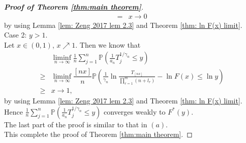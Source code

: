 \documentclass[12pt]{article}
\theoremstyle{plain}
\theoremstyle{definition}
\theoremstyle{remark}
\begin{document}
\begin{proof}[\textit{\textbf{Proof of Theorem \ref{thm:main theorem}}}]
\begin{equation*}
\begin{aligned}
=&x\to 0
 \end{aligned}
\end{equation*}
by using Lemma \ref{lem: Zeng 2017   lem 2.3} and Theorem \ref{thm: ln F(x) limit}.\\
Case 2: $y>1$.\\
Let $x\in (0,1)$, $x\nearrow 1$. Then we know that
\begin{equation*}
    \begin{aligned}
        & \liminf _{n \rightarrow \infty} \frac{1}{n} \sum_{j=1}^{n} \mathbb{P}\left(\frac{1}{a_{n}} T_{j}^{1 / \gamma_{n}} \leqslant y\right) \\
    \geq& \liminf _{n \rightarrow \infty}\dfrac{[nx]}{n} \mathbb{P}\left(\frac{1}{\gamma_{n}} \ln \frac{T_{[n x]}}{\prod_{r=1}^{m}\left(n+l_{r}\right)}-\ln F(x) \leqslant \ln y\right)
    \\  \geqslant
        &x\to 1,
    \end{aligned}
\end{equation*}
by using Lemma \ref{lem: Zeng 2017   lem 2.3} and Theorem \ref{thm: ln F(x) limit}.\\
Hence $\frac{1}{n} \sum_{j=1}^{n} \mathbb{P}\left(\frac{1}{a_{n}} T_{j}^{1 / \gamma_{n}} \leq y\right)$ converges weakly to $F^*(y)$.\\
The last part of the proof is similar to that in $(a)$. \\
This complete the proof of Theorem \ref{thm:main theorem}.
\end{proof}
\end{document}
